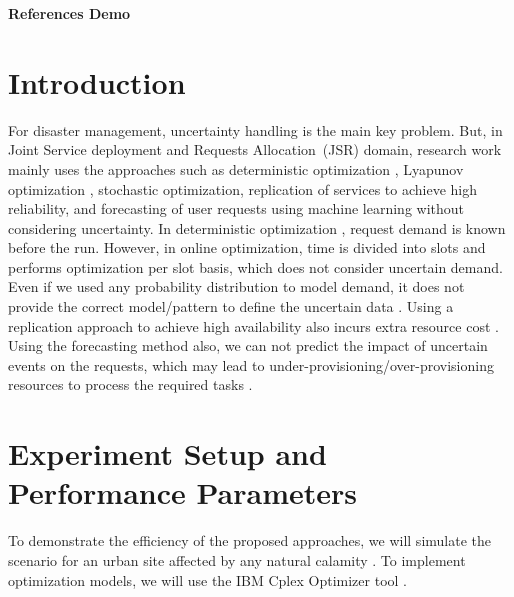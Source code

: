 \documentclass{article}
\begin{document}
\begin{center}
 \Large{\textbf{References Demo}}
\end{center}
\section{Introduction}
For disaster management, uncertainty handling is the main key problem. But, in Joint 
Service deployment and Requests Allocation~(JSR) domain, research work mainly uses the 
approaches such as deterministic optimization \cite{hardtoshare, multicell, bandwidth}, 
Lyapunov optimization \cite{dataintensive}, stochastic optimization, replication of services 
to achieve high reliability, and forecasting of user requests using machine learning without 
considering uncertainty. In deterministic optimization \cite{edgeuav}, request demand is 
known before the run. However, in online optimization, time is divided into slots and 
performs optimization per slot basis, which does not consider uncertain demand. Even if we 
used any probability distribution to model demand, it does not provide the correct 
model/pattern to define the uncertain data \cite{edgeuncertainty}. Using a replication 
approach to achieve high availability also incurs extra resource cost \cite{robust}. Using 
the forecasting method also, we can not predict the impact of uncertain events on the 
requests, which may lead to under-provisioning/over-provisioning resources to process the 
required tasks \cite{rsome}.
\section{Experiment Setup and Performance Parameters}
To demonstrate the efficiency of the proposed approaches, we will simulate the scenario 
for an urban site affected by any natural calamity \cite{oilindustry}. To implement 
optimization models, we will use the IBM Cplex Optimizer tool \cite{cplex}.


\end{document}
